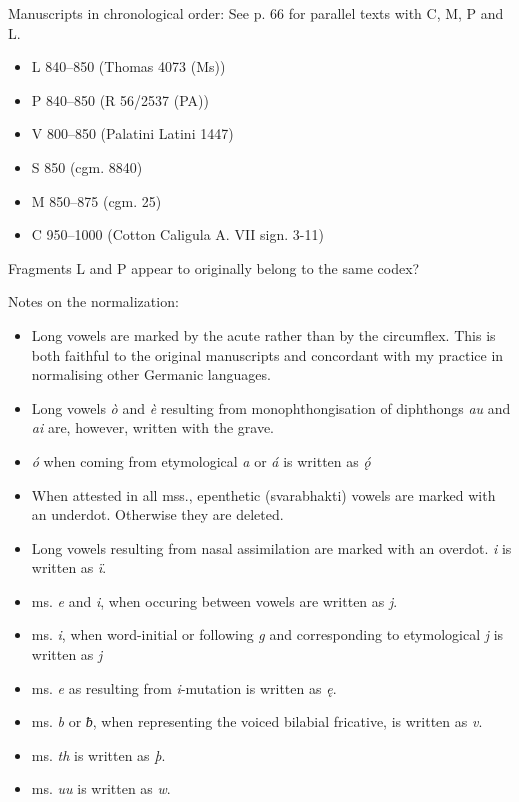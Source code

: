 
Manuscripts in chronological order:
  See p. 66 for parallel texts with C, M, P and L.

\begin{itemize}
  \item L 840–850 (Thomas 4073 (Ms))
  \item P 840–850 (R 56/2537 (PA))
  \item V 800–850 (Palatini Latini 1447)
  \item S 850 (cgm. 8840)
  \item M 850–875 (cgm. 25)
  \item C 950–1000 (Cotton Caligula A. VII sign. 3-11)
\end{itemize}

Fragments L and P appear to originally belong to the same codex?


Notes on the normalization:
  \begin{itemize}
    \item Long vowels are marked by the acute rather than by the circumflex. This is both faithful to the original manuscripts and concordant with my practice in normalising other Germanic languages.
    \item Long vowels \emph{ò} and \emph{è} resulting from monophthongisation of diphthongs \emph{au} and \emph{ai} are, however, written with the grave.
    \item \emph{ó} when coming from etymological \emph{a} or \emph{á} is written as \emph{ǫ́}
    \item When attested in all mss., epenthetic (svarabhakti) vowels are marked with an underdot. Otherwise they are deleted.
    \item Long vowels resulting from nasal assimilation are marked with an overdot. \emph{i} is written as \emph{ï}.
    \item ms. \emph{e} and \emph{i}, when occuring between vowels are written as \emph{j}.
    \item ms. \emph{i}, when word-initial or following \emph{g} and corresponding to etymological \emph{j} is written as \emph{j}
    \item ms. \emph{e} as resulting from \emph{i}-mutation is written as \emph{ę}.
    \item ms. \emph{b} or \emph{ƀ}, when representing the voiced bilabial fricative, is written as \emph{v}.
    \item ms. \emph{th} is written as \emph{þ}.
    \item ms. \emph{uu} is written as \emph{w}.
  \end{itemize}

